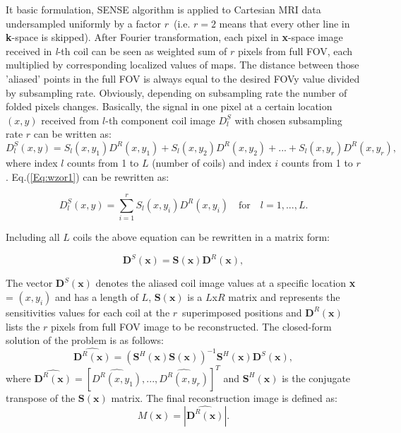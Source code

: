 It basic formulation, SENSE algorithm is applied to Cartesian MRI
data undersampled uniformly by a factor $r$~(i.e. $r=2$ means that
every other line in \textbf{k}-space is skipped). After Fourier transformation,
each pixel in \textbf{x}-space image received in \textit{l}-th coil
can be seen as weighted sum of $r$ pixels from full FOV, each multiplied
by corresponding localized values of maps. The distance between those
'aliased' points in the full FOV is always equal to the desired FOVy
value divided by subsampling rate. Obviously, depending on subsampling
rate the number of folded pixels changes. Basically, the signal in
one pixel at a certain location $(x,y)$ received from $l$-th component
coil image $D_{l}^{S}$ with chosen subsampling rate $r$ can be written
as: 
\begin{equation}
D_{l}^{S}(x,y)=S_{l}(x,y_{1})D^{R}(x,y_{1})+S_{l}(x,y_{2})D^{R}(x,y_{2})+...+S_{l}(x,y_{r})D^{R}(x,y_{r}),\label{Eq:wzor1}
\end{equation}
where index $l$ counts from 1 to $L$ (number of coils) and index
$i$ counts from 1 to $r$. Eq.(\ref{Eq:wzor1}) can be rewritten
as:

\begin{equation}
D_{l}^{S}(x,y)=\sum_{i=1}^{r}S_{l}(x,y_{i})D^{R}(x,y_{i})\quad\text{for}\quad l=1,...,L.\label{Eq:wzor2}
\end{equation}

Including all $L$ coils the above equation can be rewritten in a
matrix form:

\begin{equation}
\textbf{D}^{S}(\textbf{x})=\textbf{S}(\textbf{x})\textbf{D}^{R}(\textbf{x}),\label{Eq:wzor3}
\end{equation}

The vector $\textbf{D}^{S}(\textbf{x})$ denotes the aliased coil
image values at a specific location \textbf{x} = $(x,y_{i})$ and
has a length of $L$, $\textbf{S}(\textbf{x})$ is a $L$x$R$ matrix
and represents the sensitivities values for each coil at the $r$~superimposed
positions and $\textbf{D}^{R}(\textbf{x})$ lists the $r$ pixels
from full FOV image to be reconstructed. The closed-form solution
of the problem is as follows: 
\begin{equation}
\widehat{\textbf{D}^{R}(\textbf{x})}=(\textbf{S}^{H}(\textbf{x})\textbf{S}(\textbf{x}))^{-1}\textbf{S}^{H}(\textbf{x})\textbf{D}^{S}(\textbf{x}),\label{Eq:wzor4}
\end{equation}
where $\widehat{\textbf{D}^{R}(\textbf{x})}=[\widehat{D^{R}(x,y_{1})},...,\widehat{D^{R}(x,y_{r})}]^{T}$
and $\textbf{S}^{H}(\textbf{x})$ is the conjugate transpose of the
$\textbf{S}(\textbf{x})$ matrix. The final reconstruction image is
defined as: 
\begin{equation}
M(\textbf{x})=\left|\widehat{\textbf{D}^{R}(\textbf{x})}\right|.\label{Eq:wzor5}
\end{equation}

